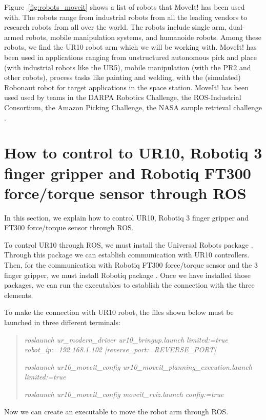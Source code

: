 Figure~\ref{fig:robots_moveit} shows a list of robots that MoveIt! has been used with. The robots range from industrial robots from all the leading vendors to research robots from all over the world. The robots include single arm, dual-armed robots, mobile manipulation systems, and humanoide robots. Among these robots, we find the UR10 robot arm which we will be working with. MoveIt! has been used in applications ranging from unstructured autonomous pick and place (with industrial robots like the UR5), mobile manipulation (with the PR2 and other robots), process tasks like painting and welding, with the (simulated) Robonaut robot for target applications in the space station. MoveIt! has been used used by teams in the DARPA Robotics Challenge, the ROS-Industrial Consortium, the Amazon Picking Challenge, the NASA sample retrieval challenge \cite{koubaa2016robot}.

\section{How to control to UR10, Robotiq 3 finger gripper and Robotiq FT300 force/torque sensor through ROS}
In this section, we explain how to control UR10, Robotiq 3 finger gripper and FT300 force/torque sensor through ROS.
%

To control UR10 through ROS, we must install the Universal Robots package \cite{urpackage}. Through this package we can establish communication with UR10 controllers. Then, for the communication with Robotiq FT300 force/torque sensor and the 3 finger gripper, we must install Robotiq package \cite{robotiq}. Once we have installed those packages, we can run the executables to establish the connection with the three elements.

To make the connection with UR10 robot, the files shown below must be launched in three different terminals:
\begin{quote}
\textit{roslaunch ur\_modern\_driver ur10\_bringup.launch limited:=true robot\_ip:=192.168.1.102 [reverse\_port:=REVERSE\_PORT]}

\textit{roslaunch ur10\_moveit\_config ur10\_moveit\_planning\_execution.launch limited:=true}

\textit{roslaunch ur10\_moveit\_config moveit\_rviz.launch config:=true}
\end{quote}

Now we can create an executable to move the robot arm through ROS.

